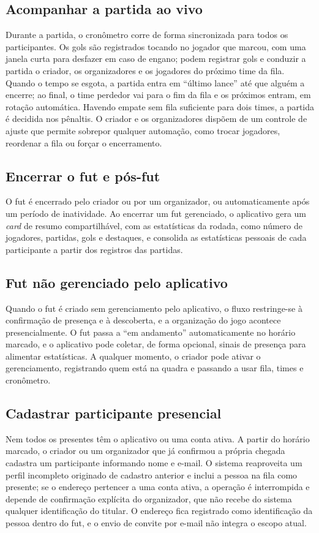     \subsection{Acompanhar a partida ao vivo}
      Durante a partida, o cronômetro corre de forma sincronizada para todos os participantes. Os gols são registrados tocando no jogador que marcou, com uma janela curta para desfazer em caso de engano; podem registrar gols e conduzir a partida o criador, os organizadores e os jogadores do próximo time da fila. Quando o tempo se esgota, a partida entra em “último lance” até que alguém a encerre; ao final, o time perdedor vai para o fim da fila e os próximos entram, em rotação automática. Havendo empate sem fila suficiente para dois times, a partida é decidida nos pênaltis. O criador e os organizadores dispõem de um controle de ajuste que permite sobrepor qualquer automação, como trocar jogadores, reordenar a fila ou forçar o encerramento.

    \subsection{Encerrar o fut e pós-fut}
      O fut é encerrado pelo criador ou por um organizador, ou automaticamente após um período de inatividade. Ao encerrar um fut gerenciado, o aplicativo gera um \textit{card} de resumo compartilhável, com as estatísticas da rodada, como número de jogadores, partidas, gols e destaques, e consolida as estatísticas pessoais de cada participante a partir dos registros das partidas.

    \subsection{Fut não gerenciado pelo aplicativo}
      Quando o fut é criado sem gerenciamento pelo aplicativo, o fluxo restringe-se à confirmação de presença e à descoberta, e a organização do jogo acontece presencialmente. O fut passa a “em andamento” automaticamente no horário marcado, e o aplicativo pode coletar, de forma opcional, sinais de presença para alimentar estatísticas. A qualquer momento, o criador pode ativar o gerenciamento, registrando quem está na quadra e passando a usar fila, times e cronômetro.

    \subsection{Cadastrar participante presencial}
      Nem todos os presentes têm o aplicativo ou uma conta ativa. A partir do horário marcado, o criador ou um organizador que já confirmou a própria chegada cadastra um participante informando nome e e-mail. O sistema reaproveita um perfil incompleto originado de cadastro anterior e inclui a pessoa na fila como presente; se o endereço pertencer a uma conta ativa, a operação é interrompida e depende de confirmação explícita do organizador, que não recebe do sistema qualquer identificação do titular. O endereço fica registrado como identificação da pessoa dentro do fut, e o envio de convite por e-mail não integra o escopo atual.

